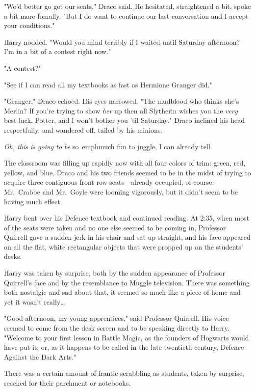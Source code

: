 "We'd better go get our seats," Draco said. He hesitated, straightened a bit, 
spoke a bit more fomally. "But I do want to continue our last conversation and 
I accept your conditions."

Harry nodded. "Would you mind terribly if I waited until Saturday afternoon? 
I'm in a bit of a contest right now."

"A contest?"

"See if I can read all my textbooks as fast as Hermione Granger did."

"Granger," Draco echoed. His eyes narrowed. "The mudblood who thinks she's 
Merlin? If you're trying to show \emph{her} up then all Slytherin wishes you 
the \emph{very} best luck, Potter, and I won't bother you 'til Saturday." Draco 
inclined his head respectfully, and wandered off, tailed by his minions.

\emph{Oh, this is going to be} so\ emph{much fun to juggle, I can already tell.}

The classroom was filling up rapidly now with all four colors of trim: green, 
red, yellow, and blue. Draco and his two friends seemed to be in the midst of 
trying to acquire three contiguous front-row seats---already occupied, of 
course. Mr.~Crabbe and Mr.~Goyle were looming vigorously, but it didn't seem to 
be having much effect.

Harry bent over his Defence textbook and continued reading.
\sbreak
At 2:35\PM, when most of the seats were taken and no one else seemed to be 
coming in, Professor Quirrell gave a sudden jerk in his chair and sat up 
straight, and his face appeared on all the flat, white rectangular objects that 
were propped up on the students' desks.

Harry was taken by surprise, both by the sudden appearance of Professor 
Quirrell's face and by the resemblance to Muggle television. There was 
something both nostalgic and sad about that, it seemed so much like a piece of 
home and yet it wasn't really{\ldots}

"Good afternoon, my young apprentices," said Professor Quirrell. His voice 
seemed to come from the desk screen and to be speaking directly to Harry. 
"Welcome to your first lesson in Battle Magic, as the founders of Hogwarts 
would have put it; or, as it happens to be called in the late twentieth 
century, Defence Against the Dark Arts."

There was a certain amount of frantic scrabbling as students, taken by 
surprise, reached for their parchment or notebooks.

